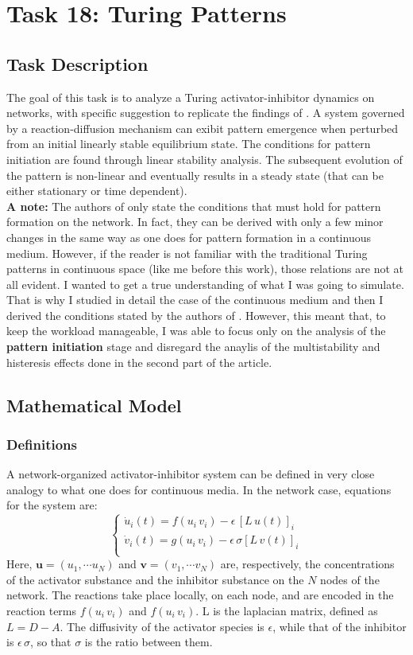 \chapter{Task 18: Turing Patterns}

\section{Task Description}
The goal of this task is to analyze a Turing activator-inhibitor dynamics on networks, with specific suggestion to replicate the findings of \cite{main_network}. 
\noindent
A system governed by a reaction-diffusion mechanism can exibit pattern emergence when perturbed from an initial linearly stable equilibrium state. The conditions for pattern initiation are found through linear stability analysis. The subsequent evolution of the pattern is non-linear and eventually results in a steady state (that can be either stationary or time dependent).
\\
\textbf{A note:} The authors of \cite{main_network} only state the conditions that must hold for pattern formation on the network. In fact, they can be derived with only a few minor changes in the same way as one does for pattern formation in a continuous medium. However, if the reader is not familiar with the traditional Turing patterns in continuous space (like me before this work), those relations are not at all evident. I wanted to get a true understanding of what I was going to simulate. That is why I studied in detail the case of the continuous medium and then I derived the conditions stated by the authors of \cite{main_network}. However, this meant that, to keep the workload manageable, I was able to focus only on the analysis of the \textbf{pattern initiation} stage and disregard the anaylis of the multistability and histeresis effects done in the second part of the article.

\section{Mathematical Model}
\subsection{Definitions}
A network-organized activator-inhibitor system can be defined in very close analogy to what one does for continuous media. 
In the network case, equations for the system are:
$$
\begin{cases}
\dot{u}_i(t) = f(u_i\, v_i) - \epsilon\,[L\,u(t)]_i \\
\dot{v}_i(t) = g(u_i\, v_i) - \epsilon\, \sigma [L\,v(t)]_i \\
\end{cases}
$$
Here, $\mathbf{u} = (u_1, \cdots u_N)$ and $\mathbf{v} = (v_1, \cdots v_N)$ are, respectively, the concentrations of the activator substance and the inhibitor substance on the $N$ nodes of the network. The reactions take place locally, on each node, and are encoded in the reaction terms $f(u_i\, v_i)$ and $f(u_i\, v_i)$. L is the laplacian matrix, defined as $L=D-A$. The diffusivity of the activator species is $\epsilon$, while that of the inhibitor is $\epsilon\,\sigma$, so that $\sigma$ is the ratio between them.

